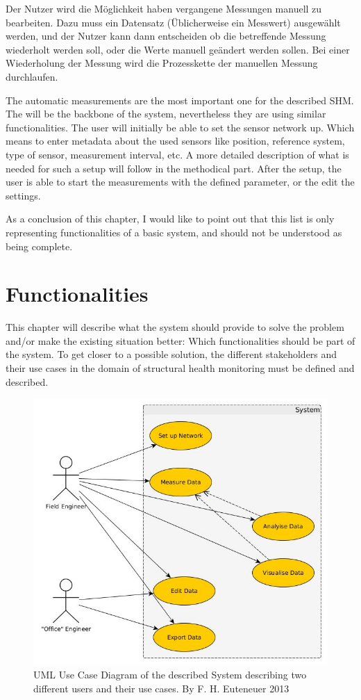 Der Nutzer wird die Möglichkeit haben vergangene Messungen manuell zu bearbeiten. Dazu muss ein Datensatz (Üblicherweise ein Messwert) ausgewählt werden, und der Nutzer kann dann entscheiden ob die betreffende Messung wiederholt werden soll, oder die Werte manuell geändert werden sollen. Bei einer Wiederholung der Messung wird die Prozesskette der manuellen Messung durchlaufen.


The automatic measurements are the most important one for the described SHM. The will be the backbone of the system, nevertheless they are using similar functionalities. The user will initially be able to set the sensor network up. Which means to enter metadata about the used sensors like position, reference system, type of sensor, measurement interval, etc. A more detailed description of what is needed for such a setup will follow in the methodical part. After the setup, the user is able to start the measurements with the defined parameter, or the edit the settings.

As a conclusion of this chapter, I would like to point out that this list is only representing functionalities of a basic system, and should not be understood as being complete.


\section{Functionalities}
This chapter will describe what the system should provide to solve the problem and/or make the existing situation better: Which functionalities should be part of the system. To get closer to a possible solution, the different stakeholders and their use cases in the domain of structural health monitoring must be defined and described.

\begin{figure}[H]
	\centering
 	 \includegraphics[scale=0.6]{graphics/uml_functionalities.jpg} 
	\caption{UML Use Case Diagram of the described System describing two different users and their use cases. By F. H. Euteneuer 2013}
	 \label{fig:model_functionalities}
\end{figure}

